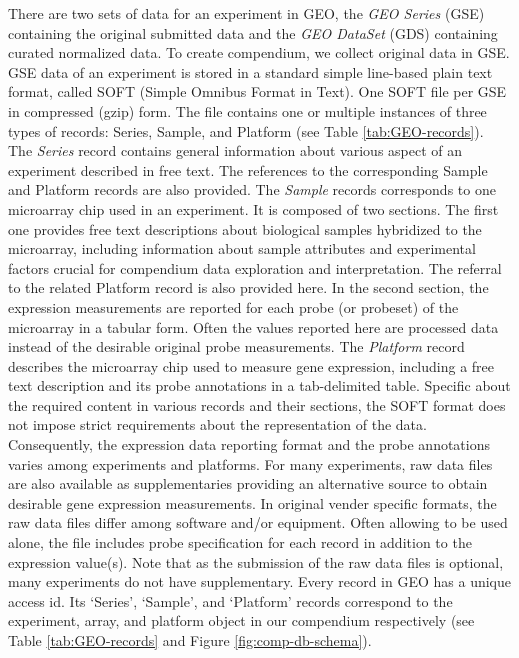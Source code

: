 %
There are two sets of data for an experiment in GEO, the \textit{GEO Series}
(GSE) containing the original submitted data and the \textit{GEO DataSet} (GDS)
containing curated normalized data.
%
To create compendium, we collect original data in GSE.
%
GSE data of an experiment is stored in a standard simple line-based plain text
format, called SOFT (Simple Omnibus Format in Text).  One SOFT file per GSE in
compressed (gzip) form.
%
The file contains one or multiple instances of three types of records: Series,
Sample, and Platform (see Table \ref{tab:GEO-records}).
%
The \textit{Series} record contains general information about various
aspect of an experiment described in free text.  The references to the
corresponding Sample and Platform records are also provided.
%
The \textit{Sample} records corresponds to one microarray chip used in an
experiment.
%
It is composed of two sections.  The first one provides free text descriptions
about biological samples hybridized to the microarray, including information
about sample attributes and experimental factors crucial for compendium data
exploration and interpretation.
%
The referral to the related Platform record is also provided here.
%
In the second section, the expression measurements are reported for each probe
(or probeset) of the microarray in a tabular form. Often the values reported
here are processed data instead of the desirable original probe measurements.
%
The \textit{Platform} record describes the microarray chip used to measure
gene expression, including a free text description and its probe annotations
in a tab-delimited table.
%
Specific about the required content in various records and their sections, the
SOFT format does not impose strict requirements about the representation of the
data.
%
Consequently, the expression data reporting format and the probe annotations
varies among experiments and platforms.
%
For many experiments, raw data files are also available as supplementaries
providing an alternative source to obtain desirable gene expression
measurements.
%
In original vender specific formats, the raw data files differ among software
and/or equipment.  Often allowing to be used alone, the file includes probe
specification for each record in addition to the expression value(s).
%
Note that as the submission of the raw data files is optional, many experiments
do not have supplementary.
%
Every record in GEO has a unique access id.
%
Its `Series', `Sample', and `Platform' records correspond to the experiment,
array, and platform object in our compendium respectively (see Table
\ref{tab:GEO-records} and Figure \ref{fig:comp-db-schema}).


